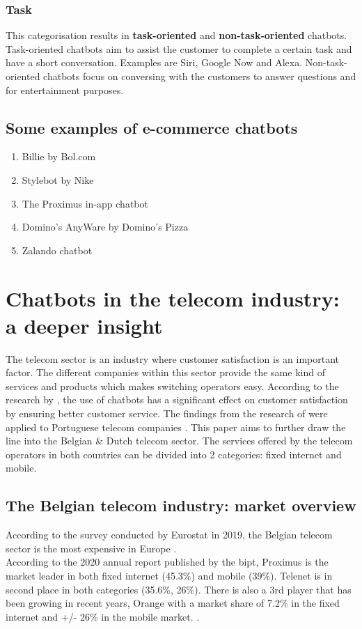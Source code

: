 \subsubsection{Task}
This categorisation results in \textbf{task-oriented} and \textbf{non-task-oriented} chatbots. Task-oriented chatbots aim to assist the customer to complete a certain task and have a short conversation. Examples are Siri, Google Now and Alexa. Non-task-oriented chatbots focus on conversing with the customers to answer questions and for entertainment purposes. \citep{Nuruzzaman2018}

\subsection{Some examples of e-commerce chatbots}
\begin{enumerate}
	\setlength\itemsep{-0.1em}
	\item Billie by Bol.com
	\item Stylebot by Nike
	\item The Proximus in-app chatbot
	\item Domino's AnyWare by Domino's Pizza
	\item Zalando chatbot
\end{enumerate}

\section{Chatbots in the telecom industry: a deeper insight}
The telecom sector is an industry where customer satisfaction is an important factor. The different companies within this sector provide the same kind of services and products which makes switching operators easy. According to the research by \citeauthor{Quintino2019}, the use of chatbots has a significant effect on customer satisfaction by ensuring better customer service. The findings from the research of \citeauthor{Quintino2019} were applied to Portuguese telecom companies \citep{Quintino2019}. This paper aims to further draw the line into the Belgian \& Dutch telecom sector. The services offered by the telecom operators in both countries can be divided into 2 categories: fixed internet and mobile.

\subsection{The Belgian telecom industry: market overview}
According to the survey conducted by Eurostat in 2019, the Belgian telecom sector is the most expensive in Europe \citep{Eurostat2020}.\\
According to the 2020 annual report published by the \acrfull{bipt}, Proximus is the market leader in both fixed internet (45.3\%) and mobile (39\%). Telenet is in second place in both categories (35.6\%, 26\%). There is also a 3rd player that has been growing in recent years, Orange with a market share of 7.2\% in the fixed internet and +/- 26\% in the mobile market. \citep{BIPT2021,VanLeemputten2021}.

